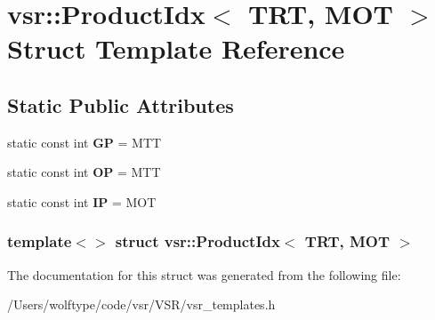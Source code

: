 \hypertarget{structvsr_1_1_product_idx_3_01_t_r_t_00_01_m_o_t_01_4}{\section{vsr\-:\-:Product\-Idx$<$ T\-R\-T, M\-O\-T $>$ Struct Template Reference}
\label{structvsr_1_1_product_idx_3_01_t_r_t_00_01_m_o_t_01_4}
}
\subsection*{Static Public Attributes}
\begin{DoxyCompactItemize}
\item 
\hypertarget{structvsr_1_1_product_idx_3_01_t_r_t_00_01_m_o_t_01_4_a72505daeb95d0aa7058224f4439def3c}{static const int {\bfseries G\-P} = M\-T\-T}\label{structvsr_1_1_product_idx_3_01_t_r_t_00_01_m_o_t_01_4_a72505daeb95d0aa7058224f4439def3c}

\item 
\hypertarget{structvsr_1_1_product_idx_3_01_t_r_t_00_01_m_o_t_01_4_a010afe4cb26b57e500ee30c477e167af}{static const int {\bfseries O\-P} = M\-T\-T}\label{structvsr_1_1_product_idx_3_01_t_r_t_00_01_m_o_t_01_4_a010afe4cb26b57e500ee30c477e167af}

\item 
\hypertarget{structvsr_1_1_product_idx_3_01_t_r_t_00_01_m_o_t_01_4_a7dd814b5d0f3a0adff9d27d3440b90c9}{static const int {\bfseries I\-P} = M\-O\-T}\label{structvsr_1_1_product_idx_3_01_t_r_t_00_01_m_o_t_01_4_a7dd814b5d0f3a0adff9d27d3440b90c9}

\end{DoxyCompactItemize}
\subsubsection*{template$<$$>$ struct vsr\-::\-Product\-Idx$<$ T\-R\-T, M\-O\-T $>$}



The documentation for this struct was generated from the following file\-:\begin{DoxyCompactItemize}
\item 
/\-Users/wolftype/code/vsr/\-V\-S\-R/vsr\-\_\-templates.\-h\end{DoxyCompactItemize}
